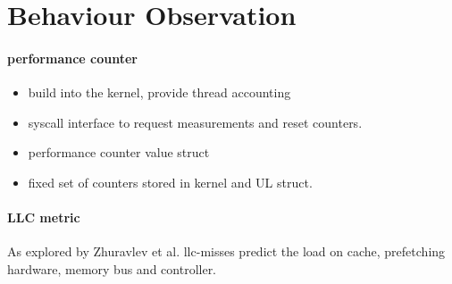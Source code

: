 \section{Behaviour Observation}
\label{design:behaviour}

\paragraph{performance counter}
\begin{itemize}
  \item build into the kernel, provide thread accounting
  \item syscall interface to request measurements and reset counters.
  \item performance counter value struct
  \item fixed set of counters stored in kernel and UL struct.
\end{itemize}

\paragraph{LLC metric}
As explored by Zhuravlev et al. \gls{llc}-misses predict the load on cache,
prefetching hardware, memory bus and controller.

\paragraph{}
